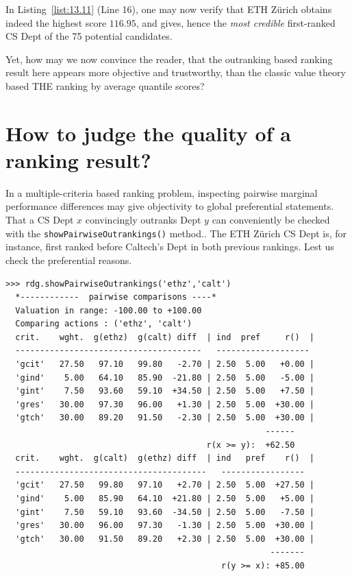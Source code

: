 In Listing~\vref{list:13.11} (Line 16), one may now verify that ETH Zürich obtains indeed the highest \NetFlows score $116.95$, and gives, hence the \emph{most credible} first-ranked CS Dept of the 75 potential candidates.

Yet, how may we now convince the reader, that the outranking based ranking result here appears more objective and trustworthy, than the classic value theory based THE ranking by average quantile scores?  

\section{How to judge the quality of a ranking result?}
\label{sec:13.3}

In a multiple-criteria based ranking problem, inspecting pairwise marginal performance differences may give objectivity to global preferential statements. That a CS Dept $x$ convincingly outranks Dept $y$ can conveniently be checked with the \texttt{showPairwiseOutrankings()} method.. The ETH Zürich CS Dept is, for instance, first ranked before Caltech's Dept in both previous rankings. Lest us check the preferential reasons.
\begin{lstlisting}[caption={Comparing pairwise criteria performances},label=list:13.12,basicstyle=\ttfamily\scriptsize]
>>> rdg.showPairwiseOutrankings('ethz','calt')
  *------------  pairwise comparisons ----*
  Valuation in range: -100.00 to +100.00
  Comparing actions : ('ethz', 'calt')
  crit.    wght.  g(ethz)  g(calt) diff  | ind  pref     r()  | 
  --------------------------------------   -------------------
  'gcit'   27.50   97.10   99.80   -2.70 | 2.50  5.00   +0.00 | 
  'gind'    5.00   64.10   85.90  -21.80 | 2.50  5.00   -5.00 | 
  'gint'    7.50   93.60   59.10  +34.50 | 2.50  5.00   +7.50 | 
  'gres'   30.00   97.30   96.00   +1.30 | 2.50  5.00  +30.00 | 
  'gtch'   30.00   89.20   91.50   -2.30 | 2.50  5.00  +30.00 |
                                                     ------
                                         r(x >= y):  +62.50
  crit.    wght.  g(calt)  g(ethz) diff  | ind   pref    r()  |
  ---------------------------------------   -----------------
  'gcit'   27.50   99.80   97.10   +2.70 | 2.50  5.00  +27.50 | 
  'gind'    5.00   85.90   64.10  +21.80 | 2.50  5.00   +5.00 | 
  'gint'    7.50   59.10   93.60  -34.50 | 2.50  5.00   -7.50 | 
  'gres'   30.00   96.00   97.30   -1.30 | 2.50  5.00  +30.00 | 
  'gtch'   30.00   91.50   89.20   +2.30 | 2.50  5.00  +30.00 |
                                                      -------
                                            r(y >= x): +85.00
\end{lstlisting}

